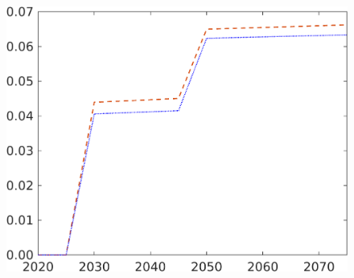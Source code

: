 \begin{figure}[h!!]
\begin{minipage}[]{0.32\textwidth}
	\end{minipage}
	\begin{minipage}[]{0.32\textwidth}
		\includegraphics[width=1\textwidth]{../../codding_model/own_basedOnFried/optimalPol_190722_tidiedUp/figures/all_July22/GovCon_DDCompEffOPT_T_NoTaus_pol3_spillover0_noskill0_sep1_xgrowth0_etaa0.79_lgd0_lff0.png}
	\end{minipage}
\end{figure}


